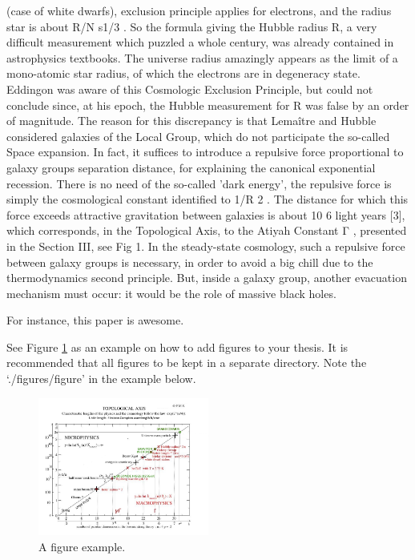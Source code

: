 (case of white dwarfs), exclusion principle applies for electrons, and the radius star is about R/N s1/3 .
So the formula giving the Hubble radius R, a very difficult measurement which puzzled a whole
century, was already contained in astrophysics textbooks. The universe radius amazingly appears as
the limit of a mono-atomic star radius, of which the electrons are in degeneracy state. Eddingon was
aware of this Cosmologic Exclusion Principle, but could not conclude since, at his epoch, the
Hubble measurement for R was false by an order of magnitude.
The reason for this discrepancy is that Lemaître and Hubble considered galaxies of the Local
Group, which do not participate the so-called Space expansion. In fact, it suffices to introduce a
repulsive force proportional to galaxy groups separation distance, for explaining the canonical
exponential recession. There is no need of the so-called 'dark energy', the repulsive force is simply
the cosmological constant identified to 1/R 2 . The distance for which this force exceeds attractive
gravitation between galaxies is about 10 6 light years [3], which corresponds, in the Topological
Axis, to the Atiyah Constant Γ , presented in the Section III, see Fig 1.
In the steady-state cosmology, such a repulsive force between galaxy groups is necessary, in
order to avoid a big chill due to the thermodynamics second principle. But, inside a galaxy group,
another evacuation mechanism must occur: it would be the role of massive black holes.

For instance, this paper \cite{fm1} is awesome.

See Figure \ref{fig:figure_label} as an example on how to add figures to your thesis.
It is recommended that all figures to be kept in a separate directory.
Note the `./figures/figure' in the example below.


\begin{figure}
\centering
\includegraphics[width=0.5\textwidth]{./figures/figure}
\caption{A figure example.}
\label{fig:figure_label}
\end{figure}


